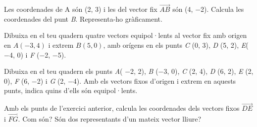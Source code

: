 \begin{mylist}
 \exer  Les coordenades de A són (2, 3) i les del vector fix $\overrightarrow{AB}$ són (4, $-$2). Calcula les coordenades del punt \textit{B}. Representa-ho gràficament.

\exer  Dibuixa en el teu quadern quatre vectors equipol·lents al vector fix amb origen en  $A( -3, 4)$ i extrem $B(5, 0)$, amb orígens en els punts \textit{C} (0, 3), \textit{D} (5, 2), \textit{E}($-$4, 0) i \linebreak \textit{F} ($-$2, $-$5). 



\exer  Dibuixa en el teu quadern els punts \textit{A}( $-$2, 2), \textit{B} ($-$3, 0), \textit{C} (2, 4), \textit{D} (6, 2), \textit{E} (2, 0), \linebreak \textit{F} (6, $-$2) i \textit{G }(2, $-$4). Amb els vectors fixos d'origen i extrem en aquests punts, indica quins d'ells són equipol·lents.

\exer  Amb els punts de l'exercici anterior, calcula les coordenades dels vectors fixos $\overrightarrow{DE}$ i $\overrightarrow{FG}$. Com són? Són dos representants d'un mateix vector lliure?



\end{mylist}

